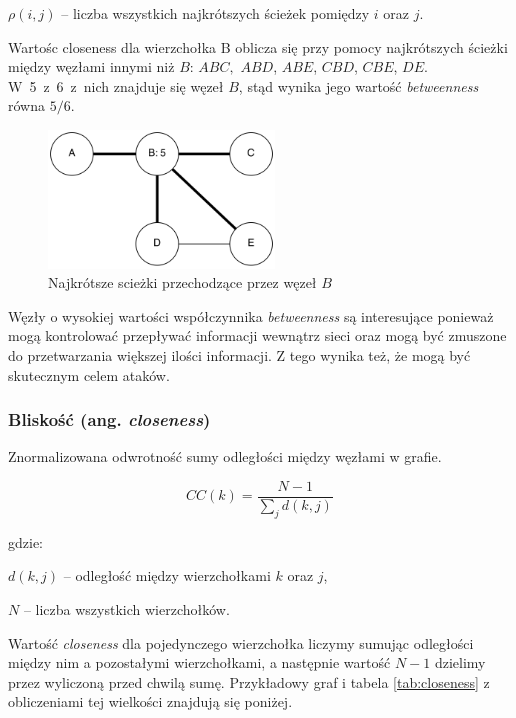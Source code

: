 $\rho(i, j)$ -- liczba wszystkich najkrótszych ścieżek pomiędzy $i$ oraz $j$.

\bigskip

Wartośc closeness dla wierzchołka B  oblicza się przy
pomocy najkrótszych ścieżki między węzłami innymi niż $B$: $ABC,$ $ABD$,
$ABE$, $CBD$, $CBE$, $DE$.
\mbox{W 5 z 6 z nich} znajduje się węzeł $B$, stąd wynika jego wartość \textit{betweenness}
równa $5/6$. 

\begin{figure}[ht!]
\centering
\includegraphics[width=60mm]{img/betweenness.png}
\caption{Najkrótsze scieżki przechodzące przez węzeł $B$}
\label{image:betweenness}
\end{figure}

Węzły o wysokiej wartości współczynnika \textit{betweenness} są interesujące
ponieważ mogą kontrolować przepływać informacji wewnątrz sieci oraz
mogą być zmuszone do przetwarzania większej ilości informacji.
Z tego wynika też, że mogą być skutecznym celem ataków.
    
  
\clearpage  
\subsubsection{Bliskość (ang. \textit{closeness})}  
Znormalizowana odwrotność sumy odległości między węzłami w grafie.
  
\begin{equation}
CC(k) = \frac{N - 1}{\sum\limits_{j}d(k, j)}
\end{equation}  

gdzie:

$d(k, j)$ -- odległość między wierzchołkami $k$ oraz $j$,

$N$ -- liczba wszystkich wierzchołków.

\bigskip

Wartość \textit{closeness} dla pojedynczego wierzchołka liczymy sumując
odległości między nim a pozostałymi wierzchołkami, a następnie wartość $N - 1$
dzielimy przez wyliczoną przed chwilą sumę.
Przykładowy graf  i tabela \ref{tab:closeness} z
obliczeniami tej wielkości znajdują się poniżej.


